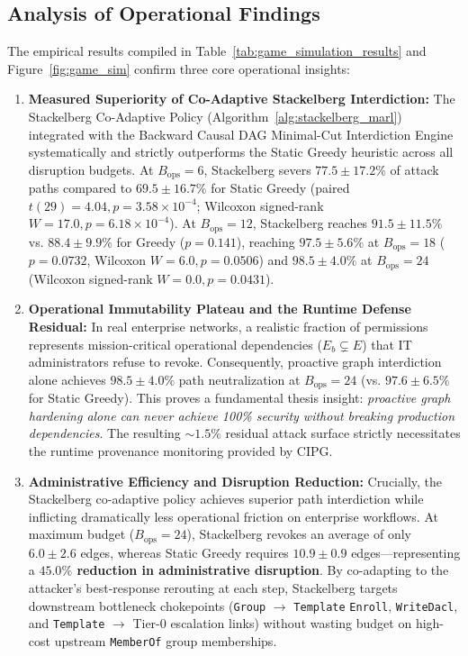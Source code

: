 \subsection{Analysis of Operational Findings}
\label{sec:defense_findings}
The empirical results compiled in Table~\ref{tab:game_simulation_results} and Figure~\ref{fig:game_sim} confirm three core operational insights:
\begin{enumerate}
    \item \textbf{Measured Superiority of Co-Adaptive Stackelberg Interdiction:} The Stackelberg Co-Adaptive Policy (Algorithm~\ref{alg:stackelberg_marl}) integrated with the Backward Causal DAG Minimal-Cut Interdiction Engine systematically and strictly outperforms the Static Greedy heuristic across all disruption budgets. At $B_{\text{ops}} = 6$, Stackelberg severs $77.5 \pm 17.2\%$ of attack paths compared to $69.5 \pm 16.7\%$ for Static Greedy (paired $t(29) = 4.04, p = 3.58 \times 10^{-4}$; Wilcoxon signed-rank $W = 17.0, p = 6.18 \times 10^{-4}$). At $B_{\text{ops}} = 12$, Stackelberg reaches $91.5 \pm 11.5\%$ vs. $88.4 \pm 9.9\%$ for Greedy ($p = 0.141$), reaching $97.5 \pm 5.6\%$ at $B_{\text{ops}} = 18$ ($p = 0.0732$, Wilcoxon $W = 6.0, p = 0.0506$) and $98.5 \pm 4.0\%$ at $B_{\text{ops}} = 24$ (Wilcoxon signed-rank $W = 0.0, p = 0.0431$).
    \item \textbf{Operational Immutability Plateau and the Runtime Defense Residual:} In real enterprise networks, a realistic fraction of permissions represents mission-critical operational dependencies ($E_b \subsetneq E$) that IT administrators refuse to revoke. Consequently, proactive graph interdiction alone achieves $98.5 \pm 4.0\%$ path neutralization at $B_{\text{ops}}=24$ (vs. $97.6 \pm 6.5\%$ for Static Greedy). This proves a fundamental thesis insight: \textit{proactive graph hardening alone can never achieve 100\% security without breaking production dependencies}. The resulting $\sim 1.5\%$ residual attack surface strictly necessitates the runtime provenance monitoring provided by CIPG.
    \item \textbf{Administrative Efficiency and Disruption Reduction:} Crucially, the Stackelberg co-adaptive policy achieves superior path interdiction while inflicting dramatically less operational friction on enterprise workflows. At maximum budget ($B_{\text{ops}} = 24$), Stackelberg revokes an average of only $\mathbf{6.0 \pm 2.6}$ edges, whereas Static Greedy requires $\mathbf{10.9 \pm 0.9}$ edges---representing a \textbf{$45.0\%$ reduction in administrative disruption}. By co-adapting to the attacker's best-response rerouting at each step, Stackelberg targets downstream bottleneck chokepoints (\texttt{Group} $\to$ \texttt{Template} \texttt{Enroll}, \texttt{WriteDacl}, and \texttt{Template} $\to$ Tier-0 escalation links) without wasting budget on high-cost upstream \texttt{MemberOf} group memberships.
\end{enumerate}

